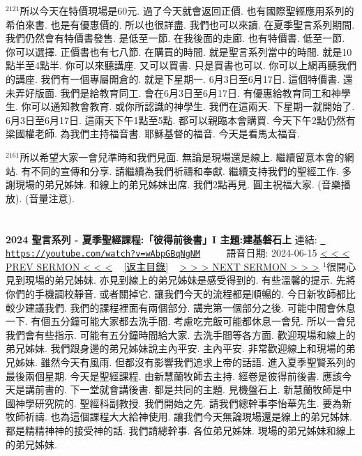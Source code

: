 \documentclass{book}
\begin{document}
$^{2121}$所以今天在特價現場是60元.
過了今天就會返回正價.
也有國際聖經應用系列的希伯來書.
也是有優惠價的.
所以也很詳盡.
我們也可以來讀.
在夏季聖言系列期間.
我們仍然會有特價書發售.
是低至一節.
在我後面的走廊.
也有特價書.
低至一節.
你可以選擇.
正價書也有七八節.
在購買的時間.
就是聖言系列當中的時間.
就是10點半至4點半.
你可以來聽講座.
又可以買書.
只是買書也可以.
你可以上網再聽我們的講座.
我們有一個專屬開倉的.
就是下星期一.
6月3日至6月17日.
這個特價書.
還未弄好版面.
我們是給教育同工.
會在6月3日至6月17日.
有優惠給教育同工和神學生.
你可以通知教會教育.
或你所認識的神學生.
我們在這兩天.
下星期一就開始了.
6月3日至6月17日.
這兩天下午1點至5點.
都可以親臨本會購買.
今天下午2點仍然有梁國權老師.
為我們主持福音書.
耶穌基督的福音.
今天是看馬太福音.

$^{2161}$所以希望大家一會兒準時和我們見面.
無論是現場還是線上.
繼續留意本會的網站.
有不同的宣傳和分享.
請繼續為我們祈禱和奉獻.
繼續支持我們的聖經工作.
多謝現場的弟兄姊妹.
和線上的弟兄姊妹出席.
我們2點再見.
圓主祝福大家.
(音樂播放).
(音量注意).
\newpage



\section{}
\label{sec:wAbpGBqNgNM}
\textbf{2024 聖言系列 - 夏季聖經課程:「彼得前後書」I 主題:建基磐石上}
\newline
\newline
連結: \href{https://youtube.com/watch?v=wAbpGBqNgNM}{\texttt{ https://youtube.com/watch?v=wAbpGBqNgNM}} ~~~~ 語音日期: 2024-06-15 
\newline
\newline
\hyperref[sec:7R3qM5b7DMI]{\small{< < < PREV SERMON < < <}}
~
\hyperref[sec:index]{\small{[返主目錄]}}
~
\hyperref[sec:evqz1q_hC_A]{\small{> > > NEXT SERMON > > >}}
\newline
\newline
$^{1}$很開心見到現場的弟兄姊妹.
亦見到線上的弟兄姊妹是感受得到的.
有些溫馨的提示.
先將你們的手機調校靜音.
或者關掉它.
讓我們今天的流程都是順暢的.
今日新牧師都比較少建議我們.
我們的課程裡面有兩個部分.
講完第一個部分之後.
可能中間會休息一下.
有個五分鐘可能大家都去洗手間.
考慮吃完飯可能都休息一會兒.
所以一會兒我們會有些指示.
可能有五分鐘時間給大家.
去洗手間等各方面.
歡迎現場和線上的弟兄姊妹.
我們跟身邊的弟兄姊妹說主內平安.
主內平安.
非常歡迎線上和現場的弟兄姊妹.
雖然今天有風雨.
但都沒有影響我們追求上帝的話語.
進入夏季聖賢系列的最後兩個星期.
今天是聖經課程.
由新慧蘭牧師去主持.
經卷是彼得前後書.
應該今天是講前書的.
下一堂就會講後書.
都是共同的主題.
見機盤石上.
新慧蘭牧師是中國神學研究院的.
聖經科副教授.
我們開始之先.
請我們總幹事李怡華先生.
要為新牧師祈禱.
也為這個課程大大給神使用.
讓我們今天無論現場還是線上的弟兄姊妹.
都是精精神神的接受神的話.
我們請總幹事.
各位弟兄姊妹.
現場的弟兄姊妹和線上的弟兄姊妹.
\end{document}
